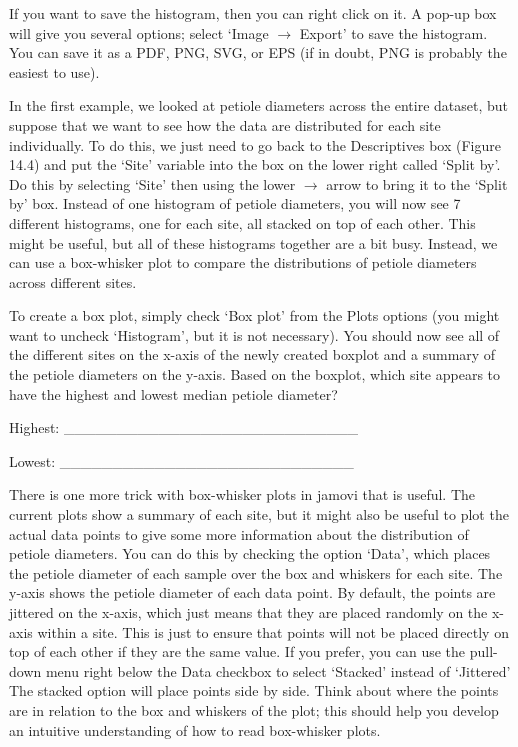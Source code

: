 \documentclass[
]{scrbook}
\begin{document}
\begin{verbatim}






\end{verbatim}

If you want to save the histogram, then you can right click on it.
A pop-up box will give you several options; select `Image \(\to\) Export' to save the histogram.
You can save it as a PDF, PNG, SVG, or EPS (if in doubt, PNG is probably the easiest to use).

In the first example, we looked at petiole diameters across the entire dataset, but suppose that we want to see how the data are distributed for each site individually.
To do this, we just need to go back to the Descriptives box (Figure 14.4) and put the `Site' variable into the box on the lower right called `Split by'.
Do this by selecting `Site' then using the lower \(\to\) arrow to bring it to the `Split by' box.
Instead of one histogram of petiole diameters, you will now see 7 different histograms, one for each site, all stacked on top of each other.
This might be useful, but all of these histograms together are a bit busy.
Instead, we can use a box-whisker plot to compare the distributions of petiole diameters across different sites.

To create a box plot, simply check `Box plot' from the Plots options (you might want to uncheck `Histogram', but it is not necessary).
You should now see all of the different sites on the x-axis of the newly created boxplot and a summary of the petiole diameters on the y-axis.
Based on the boxplot, which site appears to have the highest and lowest median petiole diameter?

Highest: \_\_\_\_\_\_\_\_\_\_\_\_\_\_\_\_\_\_\_\_\_\_\_\_\_\_\_\_

Lowest: \_\_\_\_\_\_\_\_\_\_\_\_\_\_\_\_\_\_\_\_\_\_\_\_\_\_\_\_

There is one more trick with box-whisker plots in jamovi that is useful.
The current plots show a summary of each site, but it might also be useful to plot the actual data points to give some more information about the distribution of petiole diameters.
You can do this by checking the option `Data', which places the petiole diameter of each sample over the box and whiskers for each site.
The y-axis shows the petiole diameter of each data point.
By default, the points are jittered on the x-axis, which just means that they are placed randomly on the x-axis within a site.
This is just to ensure that points will not be placed directly on top of each other if they are the same value.
If you prefer, you can use the pull-down menu right below the Data checkbox to select `Stacked' instead of `Jittered'
The stacked option will place points side by side.
Think about where the points are in relation to the box and whiskers of the plot; this should help you develop an intuitive understanding of how to read box-whisker plots.
\end{document}
